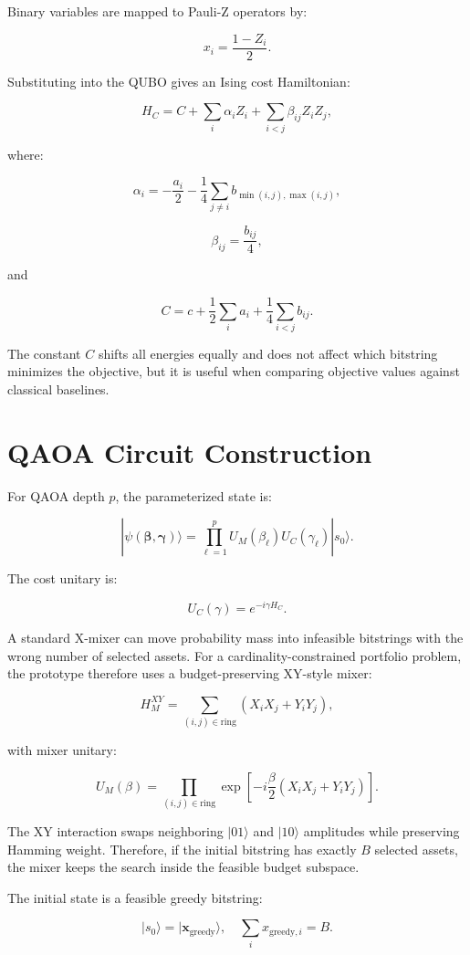 \documentclass[11pt]{article}
\begin{document}
Binary variables are mapped to Pauli-Z operators by:

\[
x_i=\frac{1-Z_i}{2}.
\]

Substituting into the QUBO gives an Ising cost Hamiltonian:

\[
H_C
=
C+
\sum_i \alpha_i Z_i+
\sum_{i<j}\beta_{ij}Z_iZ_j,
\]

where:

\[
\alpha_i
=
-\frac{a_i}{2}
-
\frac{1}{4}\sum_{j\neq i}b_{\min(i,j),\max(i,j)},
\]

\[
\beta_{ij}=\frac{b_{ij}}{4},
\]

and

\[
C
=
c+
\frac{1}{2}\sum_i a_i+
\frac{1}{4}\sum_{i<j}b_{ij}.
\]

The constant \(C\) shifts all energies equally and does not affect which bitstring minimizes the objective, but it is useful when comparing objective values against classical baselines.

\section{QAOA Circuit Construction}

For QAOA depth \(p\), the parameterized state is:

\[
|\psi(\boldsymbol{\beta},\boldsymbol{\gamma})\rangle
=
\prod_{\ell=1}^{p}
U_M(\beta_\ell)U_C(\gamma_\ell)
|s_0\rangle.
\]

The cost unitary is:

\[
U_C(\gamma)=e^{-i\gamma H_C}.
\]

A standard X-mixer can move probability mass into infeasible bitstrings with the wrong number of selected assets. For a cardinality-constrained portfolio problem, the prototype therefore uses a budget-preserving XY-style mixer:

\[
H_M^{XY}
=
\sum_{(i,j)\in\mathrm{ring}}
\left(X_iX_j+Y_iY_j\right),
\]

with mixer unitary:

\[
U_M(\beta)
=
\prod_{(i,j)\in\mathrm{ring}}
\exp\left[-i\frac{\beta}{2}(X_iX_j+Y_iY_j)\right].
\]

The XY interaction swaps neighboring \(|01\rangle\) and \(|10\rangle\) amplitudes while preserving Hamming weight. Therefore, if the initial bitstring has exactly \(B\) selected assets, the mixer keeps the search inside the feasible budget subspace.

The initial state is a feasible greedy bitstring:

\[
|s_0\rangle=|\mathbf{x}_{\mathrm{greedy}}\rangle,
\quad
\sum_i x_{\mathrm{greedy},i}=B.
\]
\end{document}

